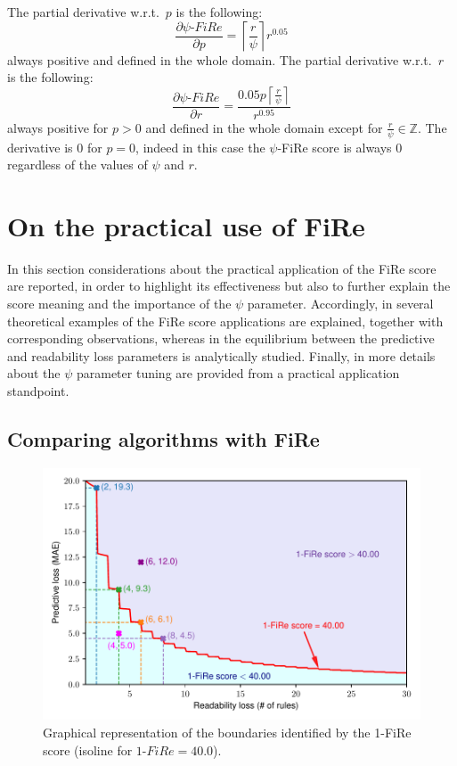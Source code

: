 \documentclass{article}
\newcommand{\fire}{FiRe}
\newcommand{\psifire}{$\psi$-\fire}
\begin{document}
The partial derivative w.r.t.\ $p$ is the following:
%
\begin{equation}
	\frac{\partial \psi\textrm{-}\fire}{\partial p} = \left \lceil{\frac{r}{\psi}}\right \rceil r^{0.05} \label{eq:partialP}
\end{equation}
%
always positive and defined in the whole domain.
%
The partial derivative w.r.t.\ $r$ is the following:
%
\begin{equation}
	\frac{\partial \psi\textrm{-}\fire}{\partial r} = \frac{0.05 p \left \lceil{\frac{r}{\psi}}\right \rceil}{r^{0.95}}\label{eq:partialR}
\end{equation}
%
always positive for $p>0$ and defined in the whole domain except for $\frac{r}{\psi} \in \mathbb{Z}$.
%
The derivative is 0 for $p=0$, indeed in this case the \psifire{} score is always 0 regardless of the values of $\psi$ and $r$.

\section{On the practical use of \fire{}}\label{sec:use}

In this section considerations about the practical application of the \fire{} score are reported, in order to highlight its effectiveness but also to further explain the score meaning and the importance of the $\psi$ parameter.
%
Accordingly, in  several theoretical examples of the \fire{} score applications are explained, together with corresponding observations, whereas in  the equilibrium between the predictive and readability loss parameters is analytically studied. Finally, in  more details about the $\psi$ parameter tuning are provided from a practical application standpoint.

\subsection{Comparing algorithms with \fire{}}\label{ssec:comp}

\begin{figure}
	\centering
	\includegraphics[width=\linewidth]{figures/boundaries.pdf}
	\caption{Graphical representation of the boundaries identified by the 1-\fire{} score (isoline for $1\textrm{-}\fire{}=40.0$).}\label{fig:boundaries}
\end{figure}
\end{document}
